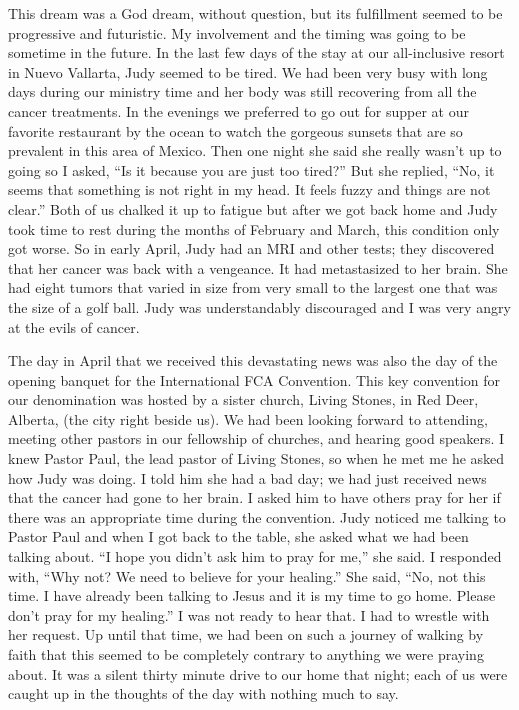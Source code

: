 \documentclass[oneside]{book}
\begin{document}
This dream was a God dream, without question, but its fulfillment seemed to be progressive and futuristic. My involvement and the timing was going to be sometime in the future. In the last few days of the stay at our all-inclusive resort in Nuevo Vallarta, Judy seemed to be tired. We had been very busy with long days during our ministry time and her body was still recovering from all the cancer treatments. In the evenings we preferred to go out for supper at our favorite restaurant by the ocean to watch the gorgeous sunsets that are so prevalent in this area of Mexico. Then one night she said she really wasn’t up to going so I asked, “Is it because you are just too tired?” But she replied, “No, it seems that something is not right in my head. It feels fuzzy and things are not clear.” Both of us chalked it up to fatigue but after we got back home and Judy took time to rest during the months of February and March, this condition only got worse. So in early April, Judy had an MRI and other tests; they discovered that her cancer was back with a vengeance. It had metastasized to her brain. She had eight tumors that varied in size from very small to the largest one that was the size of a golf ball. Judy was understandably discouraged and I was very angry at the evils of cancer. 

The day in April that we received this devastating news was also the day of the opening banquet for the International FCA Convention. This key convention for our denomination was hosted by a sister church, Living Stones, in Red Deer, Alberta, (the city right beside us). We had been looking forward to attending, meeting other pastors in our fellowship of churches, and hearing good speakers. I knew Pastor Paul, the lead pastor of Living Stones, so when he met me he asked how Judy was doing. I told him she had a bad day; we had just received news that the cancer had gone to her brain. I asked him to have others pray for her if there was an appropriate time during the convention. Judy noticed me talking to Pastor Paul and when I got back to the table, she asked what we had been talking about. “I hope you didn’t ask him to pray for me,” she said. I responded with, “Why not? We need to believe for your healing.” She said, “No, not this time. I have already been talking to Jesus and it is my time to go home. Please don’t pray for my healing.” I was not ready to hear that. I had to wrestle with her request. Up until that time, we had been on such a journey of walking by faith that this seemed to be completely contrary to anything we were praying about. It was a silent thirty minute drive to our home that night; each of us were caught up in the thoughts of the day with nothing much to say.
\end{document}
